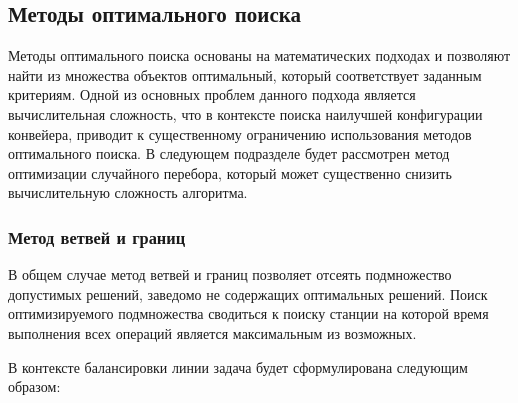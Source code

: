 \subsection{Методы оптимального поиска}
Методы оптимального поиска основаны на математических подходах и позволяют найти из множества объектов оптимальный, который соответствует заданным критериям. Одной из основных проблем данного подхода является вычислительная сложность, что в контексте поиска наилучшей конфигурации конвейера, приводит к существенному ограничению использования методов оптимального поиска. В следующем подразделе будет рассмотрен метод оптимизации случайного перебора, который может существенно снизить вычислительную сложность алгоритма.

\subsubsection*{Метод ветвей и границ}
В общем случае метод ветвей и границ позволяет отсеять подмножество допустимых решений, заведомо не содержащих оптимальных решений. Поиск оптимизируемого подмножества сводиться к поиску станции на которой время выполнения всех операций является максимальным из возможных.

В контексте балансировки линии задача будет сформулирована следующим образом:

